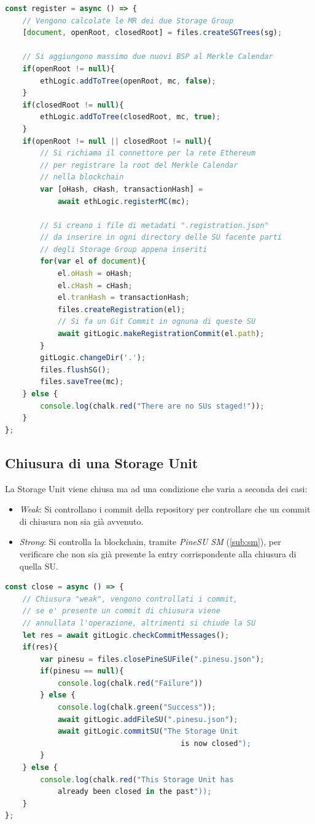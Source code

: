 \begin{lstlisting}[language=JavaScript]
const register = async () => {
    // Vengono calcolate le MR dei due Storage Group
    [document, openRoot, closedRoot] = files.createSGTrees(sg);
    
    // Si aggiungono massimo due nuovi BSP al Merkle Calendar
    if(openRoot != null){
        ethLogic.addToTree(openRoot, mc, false);
    }
    if(closedRoot != null){
        ethLogic.addToTree(closedRoot, mc, true);
    }
    if(openRoot != null || closedRoot != null){
        // Si richiama il connettore per la rete Ethereum
        // per registrare la root del Merkle Calendar
        // nella blockchain
        var [oHash, cHash, transactionHash] =
            await ethLogic.registerMC(mc);
    
        // Si creano i file di metadati ".registration.json"
        // da inserire in ogni directory delle SU facente parti
        // degli Storage Group appena inseriti
        for(var el of document){
            el.oHash = oHash;
            el.cHash = cHash;
            el.tranHash = transactionHash;
            files.createRegistration(el);
            // Si fa un Git Commit in ognuna di queste SU
            await gitLogic.makeRegistrationCommit(el.path);
        }
        gitLogic.changeDir('.');
        files.flushSG();
        files.saveTree(mc);
    } else {
        console.log(chalk.red("There are no SUs staged!"));
    }
};
\end{lstlisting}

\subsection{Chiusura di una Storage Unit}
La Storage Unit viene chiusa ma ad una condizione che varia a seconda dei casi:
\begin{itemize}
    \item \emph{Weak}: Si controllano i commit della repository per controllare che un commit di chiusura non sia già avvenuto.
    \item \emph{Strong}: Si controlla la blockchain, tramite \emph{PineSU SM} (\autoref{sub:sm}), per verificare che non sia già presente la entry corrispondente alla chiusura di quella SU.
\end{itemize}

\begin{lstlisting}[language=JavaScript]
const close = async () => {
    // Chiusura "weak", vengono controllati i commit,
    // se e' presente un commit di chiusura viene
    // annullata l'operazione, altrimenti si chiude la SU
    let res = await gitLogic.checkCommitMessages();
    if(res){
        var pinesu = files.closePineSUFile(".pinesu.json");
        if(pinesu == null){
            console.log(chalk.red("Failure"))
        } else {
            console.log(chalk.green("Success"));
            await gitLogic.addFileSU(".pinesu.json");
            await gitLogic.commitSU("The Storage Unit
                                        is now closed");
        }
    } else {
        console.log(chalk.red("This Storage Unit has
            already been closed in the past"));
    }
};
\end{lstlisting}

